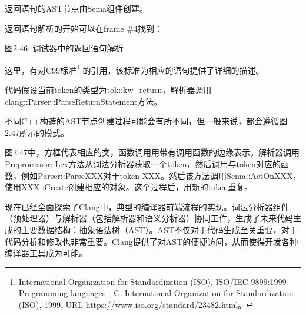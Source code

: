 返回语句的AST节点由Sema组件创建。

返回语句解析的开始可以在frame \#4找到：


\begin{center}
图2.46: 调试器中的返回语句解析
\end{center}

这里，有对C99标准\footnote{International Organization for Standardization (ISO). ISO/IEC 9899:1999 - Programming languages - C. International Organization for Standardization (ISO), 1999. URL \url{https://www.iso.org/standard/23482.html}。} 的引用，该标准为相应的语句提供了详细的描述。

代码假设当前token的类型为tok::kw\_return，解析器调用clang::Parser::ParseReturnStatement方法。

不同C++构造的AST节点创建过程可能会有所不同，但一般来说，都会遵循图2.47所示的模式。


图2.47中，方框代表相应的类，函数调用用带有调用函数的边缘表示。解析器调用Preprocessor::Lex方法从词法分析器获取一个token，然后调用与token对应的函数，例如Parser::ParseXXX对于token XXX。然后该方法调用Sema::ActOnXXX，使用XXX::Create创建相应的对象。这个过程后，用新的token重复。

现在已经全面探索了Clang中，典型的编译器前端流程的实现。词法分析器组件（预处理器）与解析器（包括解析器和语义分析器）协同工作，生成了未来代码生成的主要数据结构：抽象语法树（AST）。AST不仅对于代码生成至关重要，对于代码分析和修改也非常重要。Clang提供了对AST的便捷访问，从而使得开发各种编译器工具成为可能。












